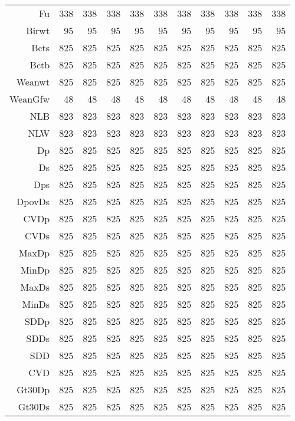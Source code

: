 \begin{table}[p]
\begin{tabular}{rrrrrrrrrrr}
  Fu & 338 & 338 & 338 & 338 & 338 & 338 & 338 & 338 & 338 & 338 \\ 
  Birwt &  95 &  95 &  95 &  95 &  95 &  95 &  95 &  95 &  95 &  95 \\ 
  Bcts & 825 & 825 & 825 & 825 & 825 & 825 & 825 & 825 & 825 & 825 \\ 
  Bctb & 825 & 825 & 825 & 825 & 825 & 825 & 825 & 825 & 825 & 825 \\ 
  Weanwt & 825 & 825 & 825 & 825 & 825 & 825 & 825 & 825 & 825 & 825 \\ 
  WeanGfw &  48 &  48 &  48 &  48 &  48 &  48 &  48 &  48 &  48 &  48 \\ 
  NLB & 823 & 823 & 823 & 823 & 823 & 823 & 823 & 823 & 823 & 823 \\ 
  NLW & 823 & 823 & 823 & 823 & 823 & 823 & 823 & 823 & 823 & 823 \\ 
  Dp & 825 & 825 & 825 & 825 & 825 & 825 & 825 & 825 & 825 & 825 \\ 
  Ds & 825 & 825 & 825 & 825 & 825 & 825 & 825 & 825 & 825 & 825 \\ 
  Dps & 825 & 825 & 825 & 825 & 825 & 825 & 825 & 825 & 825 & 825 \\ 
  DpovDs & 825 & 825 & 825 & 825 & 825 & 825 & 825 & 825 & 825 & 825 \\ 
  CVDp & 825 & 825 & 825 & 825 & 825 & 825 & 825 & 825 & 825 & 825 \\ 
  CVDs & 825 & 825 & 825 & 825 & 825 & 825 & 825 & 825 & 825 & 825 \\ 
  MaxDp & 825 & 825 & 825 & 825 & 825 & 825 & 825 & 825 & 825 & 825 \\ 
  MinDp & 825 & 825 & 825 & 825 & 825 & 825 & 825 & 825 & 825 & 825 \\ 
  MaxDs & 825 & 825 & 825 & 825 & 825 & 825 & 825 & 825 & 825 & 825 \\ 
  MinDs & 825 & 825 & 825 & 825 & 825 & 825 & 825 & 825 & 825 & 825 \\ 
  SDDp & 825 & 825 & 825 & 825 & 825 & 825 & 825 & 825 & 825 & 825 \\ 
  SDDs & 825 & 825 & 825 & 825 & 825 & 825 & 825 & 825 & 825 & 825 \\ 
  SDD & 825 & 825 & 825 & 825 & 825 & 825 & 825 & 825 & 825 & 825 \\ 
  CVD & 825 & 825 & 825 & 825 & 825 & 825 & 825 & 825 & 825 & 825 \\ 
  Gt30Dp & 825 & 825 & 825 & 825 & 825 & 825 & 825 & 825 & 825 & 825 \\ 
  Gt30Ds & 825 & 825 & 825 & 825 & 825 & 825 & 825 & 825 & 825 & 825 \\ 

\end{tabular}
\end{table}
